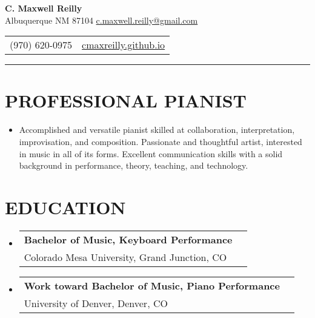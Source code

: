 \documentclass{article}
\makeatletter
\newcommand{\resumeSubHeadingListStart}{\begin{itemize}[leftmargin=0pt]}
\newcommand{\resumeSubHeadingListEnd}{\end{itemize}}
\newcommand{\resumeEducationSubheading}[2]{
        \vspace{-1pt}\item[]
            \begin{tabular*}{1\textwidth}[t]{l@{\extracolsep{\fill}}r}
                \textbf{#1} \\
                {#2} \\
            \end{tabular*}
    }
\makeatother
\begin{document}
    \begin{center}
        \textbf{\Large C. Maxwell Reilly} \\ Albuquerque NM 87104
        \href{mailto:c.maxwell.reilly@gmail.com}{c.maxwell.reilly@gmail.com}
    \end{center}\vspace{-11pt}
    \begin{center}
        \begin{tabular}{c c}
            (970) 620-0975 & \href{https://cmaxreilly.github.io}{cmaxreilly.github.io} \\
        \end{tabular}\vspace{-8pt}
    \end{center}
    \rule{\textwidth}{1pt}

    \section{PROFESSIONAL PIANIST}
        \resumeSubHeadingListStart
            \item []
                Accomplished and versatile pianist skilled at
                collaboration, interpretation, improvisation, and
                composition. Passionate and thoughtful artist, interested
                in music in all of its forms. Excellent communication
                skills with a solid background in performance, theory,
                teaching, and technology.
        \resumeSubHeadingListEnd

    \section{EDUCATION}
        \resumeSubHeadingListStart
            \resumeEducationSubheading
                {Bachelor of Music, Keyboard Performance}
                {Colorado Mesa University, Grand Junction, CO}
            \resumeEducationSubheading
                {Work toward Bachelor of Music, Piano Performance}
                {University of Denver, Denver, CO}
        \resumeSubHeadingListEnd

\end{document}
